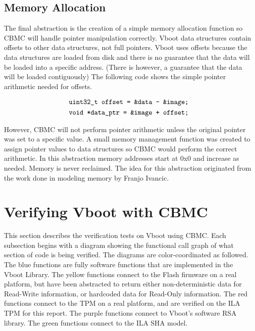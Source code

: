 \subsection{Memory Allocation}

The final abstraction is the creation of a simple memory allocation function so
CBMC will handle pointer manipulation correctly.
Vboot data structures contain offsets to other data structures, not full
pointers. 
Vboot uses offsets because the data structures are loaded from disk and there is
no guarantee that the data will be loaded into a specific address.
(There is however, a guarantee that the data will be loaded contiguously)
The following code shows the simple pointer arithmetic needed for offsets.

\begin{equation} \label{eq:ptr}
\begin{split}
    \texttt{uint32\_t offset = \&data - \&image;} \\
    \texttt{void *data\_ptr = \&image + offset;} 
\end{split}
\end{equation}

However, CBMC will not perform pointer arithmetic unless the original pointer
was set to a specific value.
A small memory management function was created to assign pointer values to data
structures so CBMC would perform the correct arithmetic.
In this abstraction memory addresses start at 0x0 and increase as needed.
Memory is never reclaimed.
The idea for this abstraction originated from the work done in modeling memory
by Franjo Ivancic\cite{eff-model-check}.

\section{Verifying Vboot with CBMC}

This section describes the verification tests on Vboot using CBMC\@.
Each subsection begins with a diagram showing the functional call graph of what section of code is being verified.
The diagrams are color-coordinated as followed.
The blue functions are fully software functions that are implemented in the Vboot Library.
The yellow functions connect to the Flash firmware on a real platform, but have been abstracted to return either non-deterministic data for Read-Write information, or hardcoded data for Read-Only information.
The red functions connect to the TPM on a real platform, and are verified on the
ILA TPM for this report.
The purple functions connect to Vboot's software RSA library. 
The green functions connect to the ILA SHA model. 

